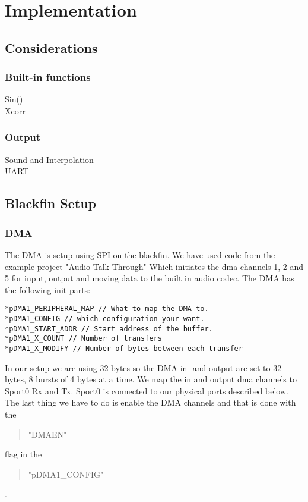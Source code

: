 \chapter{Implementation}
\section{Considerations}
\subsection{Built-in functions}
Sin()\\
Xcorr\\
\subsection{Output}
Sound and Interpolation\\
UART\\
\section{Blackfin Setup}
\subsection{DMA}
The DMA is setup using SPI on the blackfin. We have used code from the example project "Audio Talk-Through" Which initiates the dma channels 1, 2 and 5 for input, output and moving data to the built in audio codec. The DMA has the following init parts:
\begin{lstlisting}
*pDMA1_PERIPHERAL_MAP // What to map the DMA to.
*pDMA1_CONFIG // which configuration your want.
*pDMA1_START_ADDR // Start address of the buffer.
*pDMA1_X_COUNT // Number of transfers
*pDMA1_X_MODIFY // Number of bytes between each transfer
\end{lstlisting}
In our setup we are using 32 bytes so the DMA in- and output are set to 32 bytes, 8 bursts of 4 bytes at a time. We map the in and output dma channels to Sport0 Rx and Tx. Sport0 is connected to our physical ports described below. The last thing we have to do is enable the DMA channels and that is done with the \begin{quote}
"DMAEN"
\end{quote}  flag in the 
\begin{quote}
"pDMA1\_CONFIG"
\end{quote}
.\\
